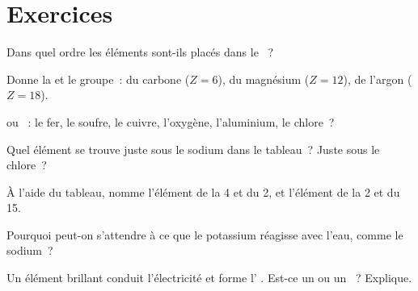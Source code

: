 \section{Exercices}

\begin{exercise}[$\star$]\label{exo:g9:periodic-table-first-look:1}
Dans quel ordre les éléments sont-ils placés dans le ~?
\end{exercise}

\begin{exercise}[$\star$]\label{exo:g9:periodic-table-first-look:2}
Donne la  et le groupe~: du carbone ($Z = 6$), du magnésium
($Z = 12$), de l'argon ($Z = 18$).
\end{exercise}

\begin{exercise}[$\star$]\label{exo:g9:periodic-table-first-look:3}
 ou ~: le fer, le soufre, le cuivre, l'oxygène,
l'aluminium, le chlore~?
\end{exercise}

\begin{exercise}[$\star$]\label{exo:g9:periodic-table-first-look:4}
Quel élément se trouve juste sous le sodium dans le tableau~? Juste sous
le chlore~?
\end{exercise}

\begin{exercise}[$\star\star$]\label{exo:g9:periodic-table-first-look:5}
À l'aide du tableau, nomme l'élément de la  4 et du  2, et
l'élément de la  2 et du  15.
\end{exercise}

\begin{exercise}[$\star\star$]\label{exo:g9:periodic-table-first-look:6}
Pourquoi peut-on s'attendre à ce que le potassium réagisse avec l'eau,
comme le sodium~?
\end{exercise}

\begin{exercise}[$\star\star$]\label{exo:g9:periodic-table-first-look:7}
Un élément brillant conduit l'électricité et forme l' .
Est-ce un  ou un ~? Explique.
\end{exercise}

